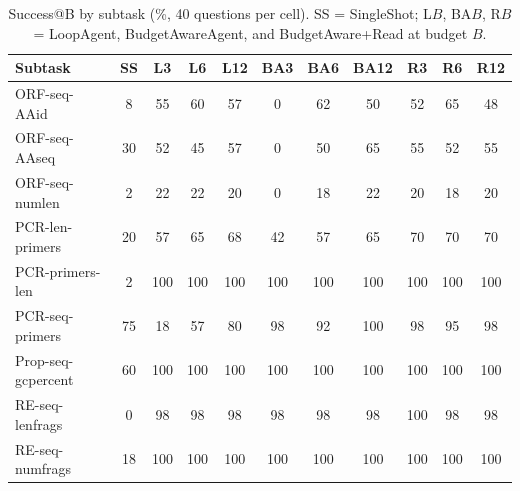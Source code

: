 \begin{table}[t]
\centering
\caption[BioBudget success by subtask]{Success@B by subtask (\%, 40 questions per cell). SS = SingleShot; L$B$, BA$B$, R$B$ = LoopAgent, BudgetAwareAgent, and BudgetAware+Read at budget $B$.}
\label{tab:biosub}
\footnotesize
\setlength{\tabcolsep}{3.5pt}
\begin{tabular}{lcccccccccc}
\toprule
Subtask & SS & L3 & L6 & L12 & BA3 & BA6 & BA12 & R3 & R6 & R12 \\
\midrule
ORF-seq-AAid & 8 & 55 & 60 & 57 & 0 & 62 & 50 & 52 & 65 & 48 \\
ORF-seq-AAseq & 30 & 52 & 45 & 57 & 0 & 50 & 65 & 55 & 52 & 55 \\
ORF-seq-numlen & 2 & 22 & 22 & 20 & 0 & 18 & 22 & 20 & 18 & 20 \\
PCR-len-primers & 20 & 57 & 65 & 68 & 42 & 57 & 65 & 70 & 70 & 70 \\
PCR-primers-len & 2 & 100 & 100 & 100 & 100 & 100 & 100 & 100 & 100 & 100 \\
PCR-seq-primers & 75 & 18 & 57 & 80 & 98 & 92 & 100 & 98 & 95 & 98 \\
Prop-seq-gcpercent & 60 & 100 & 100 & 100 & 100 & 100 & 100 & 100 & 100 & 100 \\
RE-seq-lenfrags & 0 & 98 & 98 & 98 & 98 & 98 & 98 & 100 & 98 & 98 \\
RE-seq-numfrags & 18 & 100 & 100 & 100 & 100 & 100 & 100 & 100 & 100 & 100 \\
\bottomrule
\end{tabular}
\end{table}
